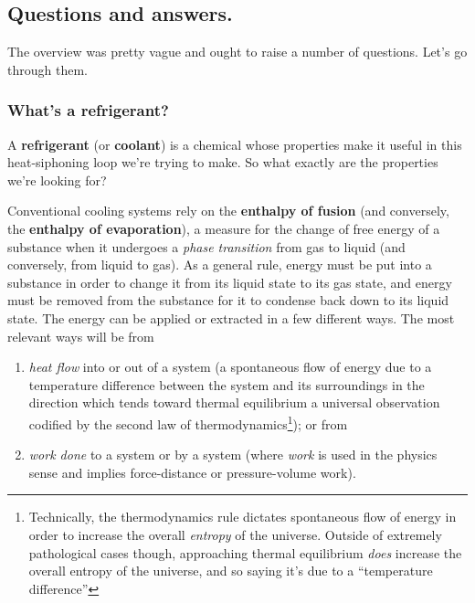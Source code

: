\documentclass[../main/main.tex]{subfiles}
\begin{document}
\subsection{Questions and answers.}

The overview was pretty vague and ought to raise a number of questions.
Let's go through them.

\subsubsection{What's a refrigerant?}

A \textbf{refrigerant} (or \textbf{coolant}) is a chemical whose
properties make it useful in this heat-siphoning loop we're trying
to make. So what exactly are the properties we're looking for?\par

Conventional cooling systems rely on the \textbf{enthalpy of fusion}
(and conversely, the \textbf{enthalpy of evaporation}),
a measure for the change of free energy of a substance when it undergoes
a \emph{phase transition} from gas to liquid
(and conversely, from liquid to gas).
As a general rule, energy must be put into a substance in order to change
it from its liquid state to its gas state, and energy must be removed
from the substance for it to condense back down to its liquid state.
The energy can be applied or extracted in a few different ways. 
The most relevant ways will be from 
\begin{enumerate}
    \item
    \emph{heat flow} into or out of a system
    (a spontaneous flow of energy due to a temperature difference between the
    system and its surroundings in the direction which tends toward
    thermal equilibrium \textemdash{} a universal observation codified
    by the second law of thermodynamics\footnote
    {
        Technically, the thermodynamics rule dictates spontaneous flow of energy
        in order to increase the overall \emph{entropy} of the universe.
        Outside of extremely pathological cases though,
        approaching thermal equilibrium \emph{does} increase the overall entropy
        of the universe, and so saying it's due to a ``temperature difference''
    }); or from 
    \item
    \emph{work done} to a system or by a system
    (where \emph{work} is used in the physics sense and implies force-distance
    or pressure-volume work).
\end{enumerate}
\end{document}
